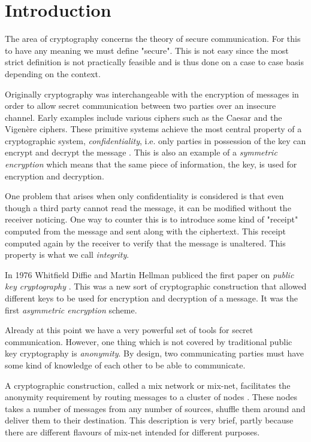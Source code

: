 \section{Introduction}

The area of cryptography concerns the theory of secure
communication. For this to have any meaning we must define
"secure". This is not easy since the most strict definition is not
practically feasible and is thus done on a case to case basis
depending on the context.

Originally cryptography was interchangeable with the encryption of
messages in order to allow secret communication between two parties
over an insecure channel. Early examples include various ciphers such
as the Caesar and the Vigenère ciphers. These primitive systems
achieve the most central property of a cryptographic system,
\emph{confidentiality}, i.e. only parties in possession of the key can
encrypt and decrypt the message \cite[p.~3]{hac}. This is also an example of a
\emph{symmetric encryption} which means that the same piece of
information, the key, is used for encryption and decryption.

One problem that arises when only confidentiality is considered is
that even though a third party cannot read the message, it can be
modified without the receiver noticing. One way to counter this is to
introduce some kind of "receipt" computed from the message and sent
along with the ciphertext. This receipt computed again by the receiver
to verify that the message is unaltered. This property is what we call
\emph{integrity}.

In 1976 Whitfield Diffie and Martin Hellman publiced the first paper
on \emph{public key cryptography} \cite[p.~2]{hac}. This was a new sort of
cryptographic construction that allowed different keys to be used for
encryption and decryption of a message. It was the first
\emph{asymmetric encryption} scheme.

Already at this point we have a very powerful set of tools for secret
communication. However, one thing which is not covered by traditional
public key cryptography is \emph{anonymity}. By design, two
communicating parties must have some kind of knowledge of each other
to be able to communicate. 

A cryptographic construction, called a mix network or mix-net,
facilitates the anonymity requirement by routing messages to a cluster
of nodes \cite[p.~1]{mixnets}. These nodes takes a number of messages
from any number of sources, shuffle them around and deliver them to
their destination. This description is very brief, partly because
there are different flavours of mix-net intended for different
purposes.

